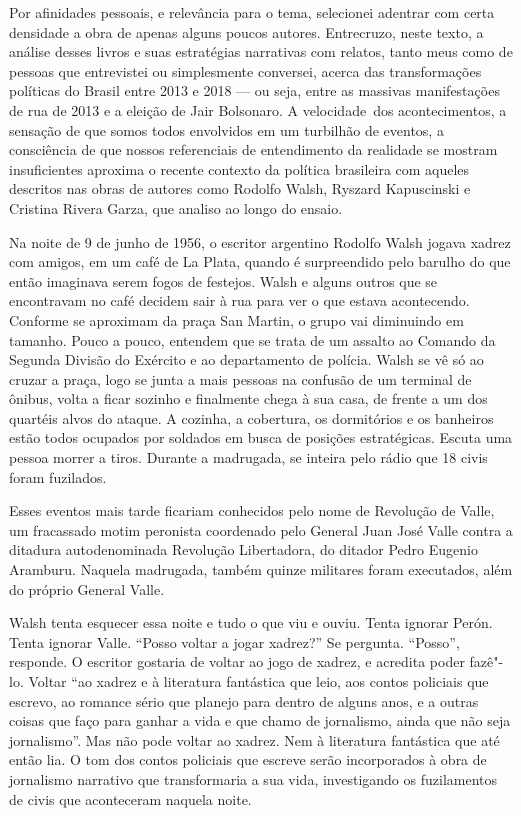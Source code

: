 Por afinidades pessoais, e relevância para o tema, selecionei adentrar com certa densidade a obra de apenas alguns poucos autores. Entrecruzo, neste texto, a análise desses livros e suas estratégias narrativas com relatos, tanto meus como de pessoas que entrevistei ou simplesmente conversei, acerca das transformações políticas do Brasil entre 2013 e 2018 --- ou seja, entre as massivas manifestações de rua de 2013 e a eleição de Jair Bolsonaro. A velocidade dos acontecimentos, a sensação de que somos todos envolvidos em um turbilhão de eventos, a consciência de que nossos referenciais de entendimento da realidade se mostram insuficientes aproxima o recente contexto da política brasileira com aqueles descritos nas obras de autores como Rodolfo Walsh, Ryszard Kapuscinski e Cristina Rivera Garza, que analiso ao longo do ensaio.

\asterisc

Na noite de 9 de junho de 1956, o escritor argentino Rodolfo Walsh
jogava xadrez com amigos, em um café de La Plata, quando é surpreendido
pelo barulho do que então imaginava serem fogos de festejos. Walsh e
alguns outros que se encontravam no café decidem sair à rua para ver o
que estava acontecendo. Conforme se aproximam da praça San Martin, o
grupo vai diminuindo em tamanho. Pouco a pouco, entendem que se trata de
um assalto ao Comando da Segunda Divisão do Exército e ao departamento
de polícia. Walsh se vê só ao cruzar a praça, logo se junta a mais
pessoas na confusão de um terminal de ônibus, volta a ficar sozinho e
finalmente chega à sua casa, de frente a um dos quartéis alvos do
ataque. A cozinha, a cobertura, os dormitórios e os banheiros estão
todos ocupados por soldados em busca de posições estratégicas. Escuta
uma pessoa morrer a tiros. Durante a madrugada, se inteira pelo rádio que
18 civis foram fuzilados.

Esses eventos mais tarde ficariam conhecidos pelo nome de Revolução de
Valle, um fracassado motim peronista coordenado pelo General Juan José
Valle contra a ditadura autodenominada Revolução Libertadora, do ditador
Pedro Eugenio Aramburu. Naquela madrugada, também quinze militares foram
executados, além do próprio General Valle.

Walsh tenta esquecer essa noite e tudo o que viu e ouviu. Tenta ignorar
Perón. Tenta ignorar Valle. ``Posso voltar a jogar xadrez?'' Se
pergunta. ``Posso'', responde. O escritor gostaria de voltar ao jogo de
xadrez, e acredita poder fazê"-lo. Voltar ``ao xadrez e à literatura
fantástica que leio, aos contos policiais que escrevo, ao romance sério
que planejo para dentro de alguns anos, e a outras coisas que faço para
ganhar a vida e que chamo de jornalismo, ainda que não seja
jornalismo''. Mas não pode voltar ao xadrez. Nem à literatura fantástica
que até então lia. O tom dos contos policiais que escreve serão incorporados à obra de jornalismo narrativo que transformaria a sua vida, investigando os fuzilamentos de civis que aconteceram naquela noite.

